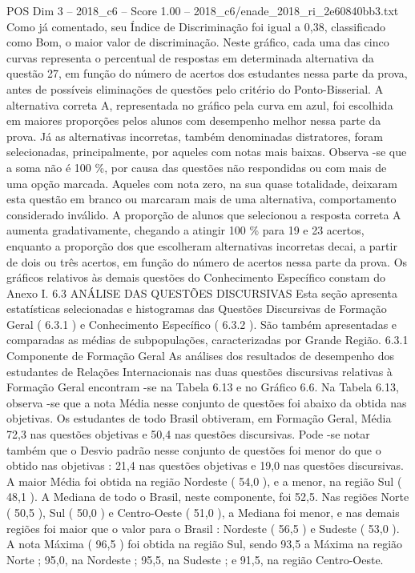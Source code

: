 \begin{textsample}{POS Dim 3 – 2018\_c6 – Score 1.00 – 2018\_c6/enade\_2018\_ri\_2e60840bb3.txt}
Como já comentado, seu Índice de Discriminação foi igual a 0,38, classificado como Bom, o maior valor de discriminação.
Neste gráfico, cada uma das cinco curvas representa o percentual de respostas em determinada alternativa da questão 27, em função do número de acertos dos estudantes nessa parte da prova, antes de possíveis eliminações de questões pelo critério do Ponto-Bisserial.
A alternativa correta A, representada no gráfico pela curva em azul, foi escolhida em maiores proporções pelos alunos com desempenho melhor nessa parte da prova.
Já as alternativas incorretas, também denominadas distratores, foram selecionadas, principalmente, por aqueles com notas mais baixas.
Observa -se que a soma não é 100 \%, por causa das questões não respondidas ou com mais de uma opção marcada.
Aqueles com nota zero, na sua quase totalidade, deixaram esta questão em branco ou marcaram mais de uma alternativa, comportamento considerado inválido.
A proporção de alunos que selecionou a resposta correta A aumenta gradativamente, chegando a atingir 100 \% para 19 e 23 acertos, enquanto a proporção dos que escolheram alternativas incorretas decai, a partir de dois ou três acertos, em função do número de acertos nessa parte da prova.
Os gráficos relativos às demais questões do Conhecimento Específico constam do Anexo I. 6.3 ANÁLISE DAS QUESTÕES DISCURSIVAS Esta seção apresenta estatísticas selecionadas e histogramas das Questões Discursivas de Formação Geral ( 6.3.1 ) e Conhecimento Específico ( 6.3.2 ).
São também apresentadas e comparadas as médias de subpopulações, caracterizadas por Grande Região. 6.3.1 Componente de Formação Geral As análises dos resultados de desempenho dos estudantes de Relações Internacionais nas duas questões discursivas relativas à Formação Geral encontram -se na Tabela 6.13 e no Gráfico 6.6.
Na Tabela 6.13, observa -se que a nota Média nesse conjunto de questões foi abaixo da obtida nas objetivas.
Os estudantes de todo Brasil obtiveram, em Formação Geral, Média 72,3 nas questões objetivas e 50,4 nas questões discursivas.
Pode -se notar também que o Desvio padrão nesse conjunto de questões foi menor do que o obtido nas objetivas : 21,4 nas questões objetivas e 19,0 nas questões discursivas.
A maior Média foi obtida na região Nordeste ( 54,0 ), e a menor, na região Sul ( 48,1 ).
A Mediana de todo o Brasil, neste componente, foi 52,5.
Nas regiões Norte ( 50,5 ), Sul ( 50,0 ) e Centro-Oeste ( 51,0 ), a Mediana foi menor, e nas demais regiões foi maior que o valor para o Brasil : Nordeste ( 56,5 ) e Sudeste ( 53,0 ).
A nota Máxima ( 96,5 ) foi obtida na região Sul, sendo 93,5 a Máxima na região Norte ; 95,0, na Nordeste ; 95,5, na Sudeste ; e 91,5, na região Centro-Oeste.

\end{textsample}
